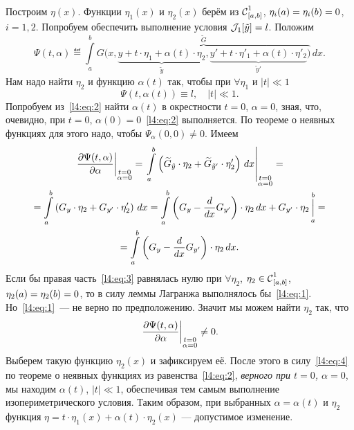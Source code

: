 Построим $\eta(x)$. Функции $\eta_1(x)$ и $\eta_2(x)$ берём из $\Cfn[{[a,b]}]{1}$, $\eta_i(a)=\eta_i(b)\?=0$, $i=1,2$. Попробуем обеспечить выполнение условия $\J_1[\tilde{y}]=l$. Положим
\begin{equation*}
	\Psi(t,\alpha)\eqdef\int\limits_a^b \overbrace{G\big(x,\underbrace{y+t\cdot\eta_1+\alpha(t)\cdot\eta_2}_{\tilde{y}},\underbrace{y'+t\cdot\eta'_1+\alpha(t)\cdot\eta'_2}_{\tilde{y}'}\big)}^{\widetilde{G}}\,dx.
\end{equation*}
Нам надо найти $\eta_2$ и функцию $\alpha(t)$ так, чтобы при $\forall\eta_1$ и $|t|\ll1$
\begin{equation}
	\label{l4:eq:2}
	\Psi(t,\alpha(t))\equiv l,\quad|t|\ll1.
\end{equation}
Попробуем из~\eqref{l4:eq:2} найти $\alpha(t)$ в окрестности $t=0$, $\alpha=0$, зная, что, очевидно, при $t=0$, ${\alpha(0)=0}$~\eqref{l4:eq:2} выполняется. По теореме о неявных функциях для этого надо, чтобы $\Psi_{\alpha}(0,0)\neq0$. Имеем
\begin{multline}
	\label{l4:eq:3}
	\left.\pder{\Psi(t,\alpha)}{\alpha}\right|_{\substack{t=0\\\alpha=0}}=\left.\int\limits_a^b\left(\widetilde{G}_{\tilde{y}}\cdot\eta_2+\widetilde{G}_{\tilde{y}'}\cdot\eta'_2\right)\,dx\right|_{\substack{t=0\\\alpha=0}}=\\=\int\limits_a^b\left({G}_{{y}}\cdot\eta_2+{G}_{y'}\cdot\eta'_2\right)\,dx
	=\int\limits_a^b\left(G_y-\der{}{x}G_{y'}\right)\cdot\eta_2\,dx+G_{y'}\cdot\eta_2\mathop{\Big|}\limits_a^b=\\=\int\limits_a^b\left(G_y-\der{}{x}G_{y'}\right)\cdot\eta_2\,dx.
\end{multline}
Если бы правая часть~\eqref{l4:eq:3} равнялась нулю при $\forall\eta_2$, $\eta_2\in\Cfn[{[a,b]}]{1}$, $\eta_2(a)\?=\eta_2(b)=0$, то в силу леммы Лагранжа выполнялось бы~\eqref{l4:eq:1}. Но~\eqref{l4:eq:1}~--- не верно по предположению. Значит мы можем найти $\eta_2$ так, что
\begin{equation}
	\label{l4:eq:4}
	\left.\pder{\Psi(t,\alpha)}{\alpha}\right|_{\substack{t=0\\\alpha=0}}\neq0.
\end{equation}
Выберем такую функцию $\eta_2(x)$ и зафиксируем её. После этого в силу~\eqref{l4:eq:4} по теореме о неявных функциях из равенства~\eqref{l4:eq:2}, \emph{верного при  $t=0$, $\alpha=0$}, мы находим $\alpha(t)$, $|t|\ll1$, обеспечивая тем самым выполнение изопериметрического условия. Таким образом, при выбранных $\alpha=\alpha(t)$ и $\eta_2$ функция $\eta=t\cdot\eta_1(x)+\alpha(t)\cdot\eta_2(x)$ --- допустимое изменение.

